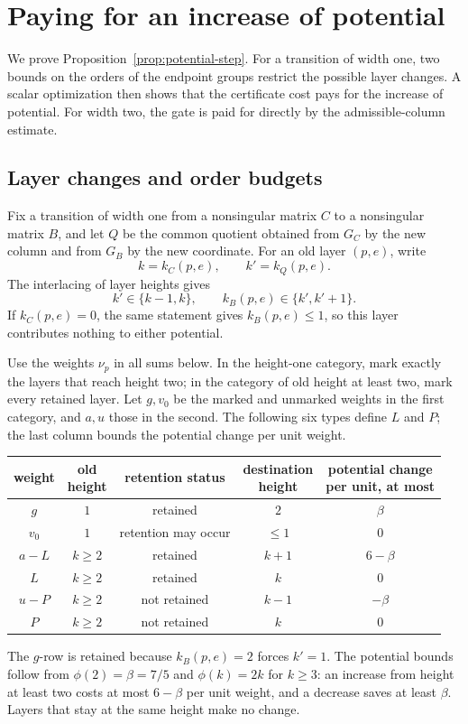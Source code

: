 \section{Paying for an increase of potential}\label{sec:potential-step}

We prove Proposition~\ref{prop:potential-step}. For a transition of
width one, two bounds on the orders of the endpoint groups restrict the
possible layer changes. A scalar optimization then shows that the
certificate cost pays for the increase of potential. For width two,
the gate is paid for directly by the admissible-column estimate.

\subsection{Layer changes and order budgets}

Fix a transition of width one from a nonsingular matrix \(C\) to a
nonsingular matrix \(B\), and let \(Q\) be the common quotient obtained
from \(G_C\) by the new column and from \(G_B\) by the new coordinate.
For an old layer \((p,e)\), write
\[
 k=k_C(p,e),\qquad k'=k_Q(p,e).
\]
The interlacing of layer heights gives
\[
 k'\in\{k-1,k\},\qquad k_B(p,e)\in\{k',k'+1\}.
\]
If \(k_C(p,e)=0\), the same statement gives \(k_B(p,e)\le1\), so this
layer contributes nothing to either potential.

Use the weights \(\nu_p\) in all sums below. In the height-one category,
mark exactly the layers that reach height two; in the category of old
height at least two, mark every retained layer. Let \(g,v_0\) be the
marked and unmarked weights in the first category, and \(a,u\) those in
the second. The following six types define \(L\) and \(P\); the last
column bounds the potential change per unit weight.
\begin{center}
\begin{tabular}{@{}ccccc@{}}
\toprule
weight & \shortstack{old\\height} & retention status
 & \shortstack{destination\\height}
 & \shortstack{potential change\\per unit, at most}\\
\midrule
\(g\) & \(1\) & retained & \(2\) & \(\beta\)\\
\(v_0\) & \(1\) & retention may occur & \(\le1\) & \(0\)\\
\(a-L\) & \(k\ge2\) & retained & \(k+1\) & \(6-\beta\)\\
\(L\) & \(k\ge2\) & retained & \(k\) & \(0\)\\
\(u-P\) & \(k\ge2\) & not retained & \(k-1\) & \(-\beta\)\\
\(P\) & \(k\ge2\) & not retained & \(k\) & \(0\)\\
\bottomrule
\end{tabular}
\end{center}
The \(g\)-row is retained because \(k_B(p,e)=2\) forces \(k'=1\).
The potential bounds follow from \(\phi(2)=\beta=7/5\) and
\(\phi(k)=2k\) for \(k\ge3\): an increase from height at least two
costs at most \(6-\beta\) per unit weight, and a decrease saves at
least \(\beta\). Layers that stay at the same height make no change.

